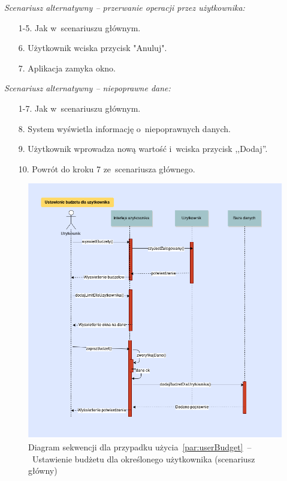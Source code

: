 \noindent \textit{Scenariusz alternatywny -- przerwanie operacji przez użytkownika:}
\begin{enumerate}
  \item[1-5.] Jak w~scenariuszu głównym.
  \item[6.] Użytkownik wciska przycisk "Anuluj".
  \item[7.] Aplikacja zamyka okno.
\end{enumerate}

\noindent \textit{Scenariusz alternatywny -- niepoprawne dane:}
\begin{enumerate}
  \item[1-7.] Jak w~scenariuszu głównym.
  \item[8.] System wyświetla informację o~niepoprawnych danych.
  \item[9.] Użytkownik wprowadza nową wartość i~wciska przycisk ,,Dodaj''.
  \item[10.] Powrót do kroku 7 ze~scenariusza głównego.
\end{enumerate}

\begin{figure}[H]
  \includegraphics[width=\textwidth]{images/dodanie_budzetu_dla_usera.png}
  \caption{Diagram sekwencji dla przypadku użycia~\ref{par:userBudget}~--~Ustawienie budżetu dla określonego użytkownika (scenariusz główny)}
\end{figure}

